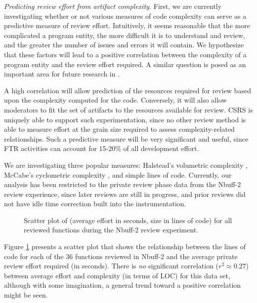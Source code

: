 \begin{itemizenoindent}
  
\item {\em Predicting review effort from artifact complexity.} First, we
  are currently investigating whether or not various measures of code
  complexity can serve as a predictive measure of review effort.
  Intuitively, it seems reasonable that the more complicated a program
  entity, the more difficult it is to understand and review, and the
  greater the number of issues and errors it will contain.  We hypothesize
  that these factors will lead to a positive correlation between the
  complexity of a program entity and the review effort required.  A
  similar question is posed as an important area for future research in
  \cite{Fagan86}.
  
  A high correlation will allow prediction of the resources required for
  review based upon the complexity computed for the code. Conversely, it
  will also allow moderators to fit the set of artifacts to the
  resources available for review.  CSRS is uniquely able to support such
  experimentation, since no other review method is able to measure effort
  at the grain size required to assess complexity-related relationships.
  Such a predictive measure will be very significant and useful, since
  FTR activities can account for 15-20\% of all development effort.
  
  We are investigating three popular measures: Halstead's volumetric
  complexity \cite{Halstead77}, McCabe's cyclometric complexity
  \cite{McCabe76}, and simple lines of code. Currently, our analysis has
  been restricted to the private review phase data from the Nbuff-2
  review experience, since later reviews are still in progress, and prior
  reviews did not have idle time correction built into the
  instrumentation.
  
\begin{figure}                                        
 {\centerline{}}
 \caption{Scatter plot of (average effort in seconds, size in lines of
 code) for all reviewed functions during the Nbuff-2 review
 experiment.}
\label{fig:review-complexity-correlation}
\end{figure}

  Figure \ref{fig:review-complexity-correlation} presents a scatter plot that
  shows the relationship between the lines of code for each of the 36
  functions reviewed in Nbuff-2 and the average private review effort
  required (in seconds). There is {\em no} significant correlation ($r^{2}
  \approx 0.27$) between average effort and complexity (in terms of LOC) for
  this data set, although with some imagination, a general trend toward a
  positive correlation might be seen.
  

\end{itemizenoindent}
